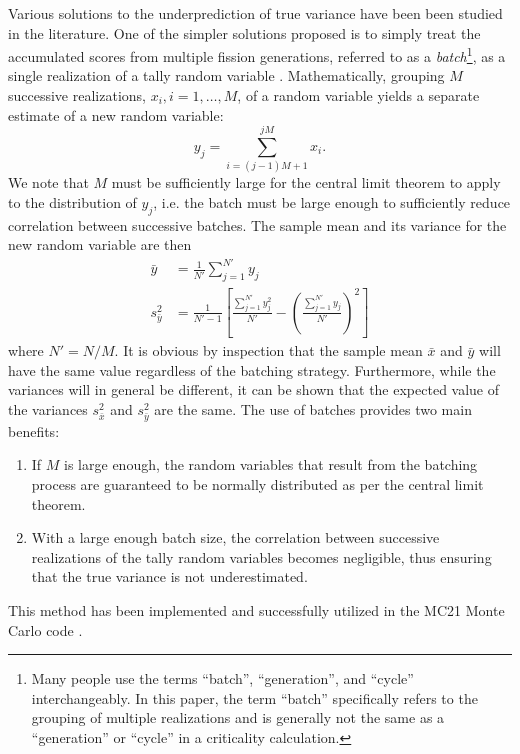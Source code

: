 Various solutions to the underprediction of true variance have been been studied
in the literature. One of the simpler solutions proposed is to simply treat the
accumulated scores from multiple fission generations, referred to as a
\emph{batch}\footnote{Many people use the terms ``batch'', ``generation'', and
  ``cycle'' interchangeably. In this paper, the term ``batch'' specifically
  refers to the grouping of multiple realizations and is generally not the same
  as a ``generation'' or ``cycle'' in a criticality calculation.}, as a single
realization of a tally random variable \cite{pne-gelbard-1990}. Mathematically,
grouping $M$ successive realizations, $x_i, i = 1,\dots,M$, of a random variable
yields a separate estimate of a new random variable:
\begin{equation}
  y_j = \sum_{i=(j-1)M + 1}^{jM} x_i.
\end{equation}
We note that $M$ must be sufficiently large for the central limit theorem to
apply to the distribution of $y_j$, i.e. the batch must be large enough to
sufficiently reduce correlation between successive batches. The sample mean and
its variance for the new random variable are then
\begin{align}
  \bar{y} &= \frac{1}{N'} \sum_{j=1}^{N'} y_j \\ s^2_{\bar{y}} &= \frac{1}{N'-1}
  \left [ \frac{\sum_{j=1}^{N'} y_j^2}{N'} - \left ( \frac{\sum_{j=1}^{N'} y_j}{N'}
    \right )^2 \right ]
\end{align}
where $N' = N/M$. It is obvious by inspection that the sample mean $\bar{x}$ and
$\bar{y}$ will have the same value regardless of the batching
strategy. Furthermore, while the variances will in general be different, it can
be shown that the expected value of the variances $s^2_{\bar{x}}$ and
$s^2_{\bar{y}}$ are the same. The use of batches provides two main benefits:
\begin{enumerate}
  \item If $M$ is large enough, the random variables that result from the
    batching process are guaranteed to be normally distributed as per the
    central limit theorem.
  \item With a large enough batch size, the correlation between successive
    realizations of the tally random variables becomes negligible, thus ensuring
    that the true variance is not underestimated.
\end{enumerate}
This method has been implemented and successfully utilized in the MC21 Monte
Carlo code \cite{physor-kelly-2012}.

